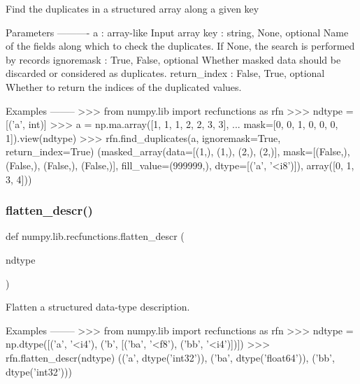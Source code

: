 \begin{DoxyVerb}Find the duplicates in a structured array along a given key

Parameters
----------
a : array-like
    Input array
key : {string, None}, optional
    Name of the fields along which to check the duplicates.
    If None, the search is performed by records
ignoremask : {True, False}, optional
    Whether masked data should be discarded or considered as duplicates.
return_index : {False, True}, optional
    Whether to return the indices of the duplicated values.

Examples
--------
>>> from numpy.lib import recfunctions as rfn
>>> ndtype = [('a', int)]
>>> a = np.ma.array([1, 1, 1, 2, 2, 3, 3],
...         mask=[0, 0, 1, 0, 0, 0, 1]).view(ndtype)
>>> rfn.find_duplicates(a, ignoremask=True, return_index=True)
(masked_array(data=[(1,), (1,), (2,), (2,)],
             mask=[(False,), (False,), (False,), (False,)],
       fill_value=(999999,),
            dtype=[('a', '<i8')]), array([0, 1, 3, 4]))
\end{DoxyVerb}
 \mbox{\label{namespacenumpy_1_1lib_1_1recfunctions_ab6dfe0d2538c9ccf8c43f16529ee6984}} 
\subsubsection{\texorpdfstring{flatten\+\_\+descr()}{flatten\_descr()}}
{\footnotesize\ttfamily def numpy.\+lib.\+recfunctions.\+flatten\+\_\+descr (\begin{DoxyParamCaption}\item[{}]{ndtype }\end{DoxyParamCaption})}

\begin{DoxyVerb}Flatten a structured data-type description.

Examples
--------
>>> from numpy.lib import recfunctions as rfn
>>> ndtype = np.dtype([('a', '<i4'), ('b', [('ba', '<f8'), ('bb', '<i4')])])
>>> rfn.flatten_descr(ndtype)
(('a', dtype('int32')), ('ba', dtype('float64')), ('bb', dtype('int32')))\end{DoxyVerb}
 \mbox{\label{namespacenumpy_1_1lib_1_1recfunctions_ab6792feb20aacdff2d1b1907a65c9add}} 
